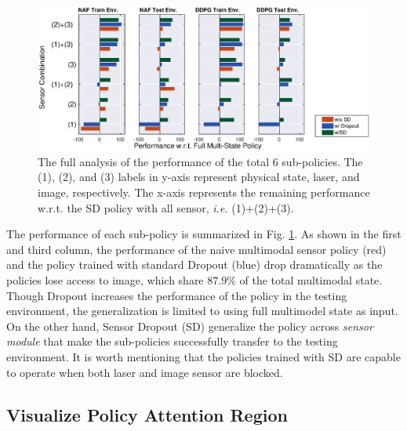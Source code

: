 \documentclass[../thesis.tex]{subfiles}
\begin{document}
\begin{figure}[t]
\vskip -0.1in
\centering
\includegraphics[width=\columnwidth]{./MultimodalDRL/fig/all_policy}
\caption{The full analysis of the performance of the total $6$ sub-policies. The (1), (2), and (3) labels in y-axis represent physical state, laser, and image, respectively. The x-axis represents the remaining performance w.r.t. the SD policy with all sensor, \textit{i.e.} (1)+(2)+(3).}
\label{fig:full-sd-policy}
\vskip -0.1in
\end{figure}
 
The performance of each sub-policy is summarized in Fig. \ref{fig:full-sd-policy}.
As shown in the first and third column, the performance of the naive multimodal sensor policy (red) and the policy trained with standard Dropout (blue) drop dramatically as the policies lose access to image, which share $87.9\%$ of the total multimodal state. Though Dropout increases the performance of the policy in the testing environment, the generalization is limited to using full multimodel state as input. On the other hand, Sensor Dropout (SD) generalize the policy across \textit{sensor module} that make the sub-policies successfully transfer to the testing environment. It is worth mentioning that the policies trained with SD are capable to operate when both laser and image sensor are blocked.
 
 
\subsection{Visualize Policy Attention Region}
 
\end{document}
